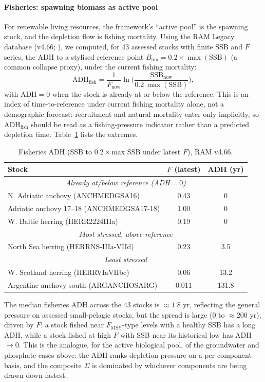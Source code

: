 \documentclass[twocolumn,10pt]{article}
\begin{document}
\paragraph{Fisheries: spawning biomass as active pool}
\label{sec:adh-fisheries}

For renewable living resources, the framework's ``active pool'' is the spawning stock, and the depletion flow is fishing mortality. Using the RAM Legacy database (v4.66; \cite{ricard2012}), we computed, for 43 assessed stocks with finite SSB and $F$ series, the ADH to a stylised reference point $B_{\text{lim}}=0.2\times\max(\text{SSB})$ (a common collapse proxy), under the current fishing mortality:
\[
\text{ADH}_{\text{fish}} = \frac{1}{F_{\text{now}}}\ln\!\Big(\frac{\text{SSB}_{\text{now}}}{0.2\,\max(\text{SSB})}\Big),
\]
with $\text{ADH}=0$ when the stock is already at or below the reference. This is an index of time-to-reference under current fishing mortality alone, not a demographic forecast: recruitment and natural mortality enter only implicitly, so $\text{ADH}_{\text{fish}}$ should be read as a fishing-pressure indicator rather than a predicted depletion time. Table~\ref{tab:adh-fish} lists the extremes.

\begin{table}[h]
\centering
\small
\caption{Fisheries ADH (SSB to $0.2\times$max SSB under latest $F$), RAM v4.66.}
\label{tab:adh-fish}
\begin{tabular}{lcc}
\toprule
Stock & $F$ (latest) & ADH (yr) \\
\midrule
\multicolumn{3}{c}{\emph{Already at/below reference (ADH$=0$)}} \\
N. Adriatic anchovy (ANCHMEDGSA16) & 0.43 & 0 \\
Adriatic anchovy 17--18 (ANCHMEDGSA17-18) & 1.00 & 0 \\
W. Baltic herring (HERR2224IIIa) & 0.19 & 0 \\
\multicolumn{3}{c}{\emph{Most stressed, above reference}} \\
North Sea herring (HERRNS-IIIa-VIId) & 0.23 & 3.5 \\
\multicolumn{3}{c}{\emph{Least stressed}} \\
W. Scotland herring (HERRVIaVIIbc) & 0.06 & 13.2 \\
Argentine anchovy south (ARGANCHOSARG) & 0.011 & 131.8 \\
\bottomrule
\end{tabular}
\end{table}

The median fisheries ADH across the 43 stocks is $\approx1.8$ yr, reflecting the general pressure on assessed small-pelagic stocks, but the spread is large (0 to $\approx200$ yr), driven by $F$: a stock fished near $F_{\text{MSY}}$-type levels with a healthy SSB has a long ADH, while a stock fished at high $F$ with SSB near its historical low has ADH $\to0$. This is the analogue, for the active biological pool, of the groundwater and phosphate cases above: the ADH ranks depletion pressure on a per-component basis, and the composite $\Sigma$ is dominated by whichever components are being drawn down fastest.
\end{document}
